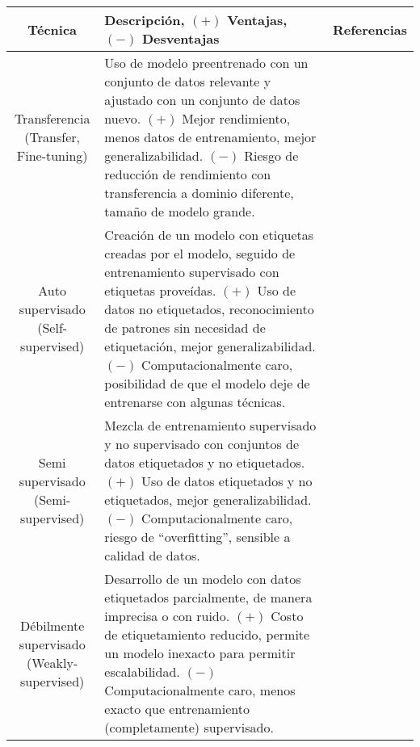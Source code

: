 \begin{center}
    \vspace{-\topsep}
    \begin{table}[h!]
        \footnotesize
        \begin{tabular}{ |c|m{9.5cm}|c| }
            \hline
            \bf Técnica & \bf Descripción, $(+)$ Ventajas, $(-)$ Desventajas & \bf Referencias \\
            \hline
            \makecell{Transferencia \\ (Transfer, Fine-tuning)} & Uso de modelo preentrenado con un conjunto de datos relevante y ajustado con un conjunto de datos nuevo. $(+)$ Mejor rendimiento, menos datos de entrenamiento, mejor generalizabilidad. $(-)$ Riesgo de reducción de rendimiento con transferencia a dominio diferente, tamaño de modelo grande. & \makecell{\autocite{safonova-2023,maggiori-2016-0,castelluccio-2015} \\ \autocite{nogueira-2017,zhong-2016,amato-2023}} \\
            \hline
            \makecell{Auto supervisado \\ (Self-supervised)} & Creación de un modelo con etiquetas creadas por el modelo, seguido de entrenamiento supervisado con etiquetas proveídas. $(+)$ Uso de datos no etiquetados, reconocimiento de patrones sin necesidad de etiquetación, mejor generalizabilidad. $(-)$ Computacionalmente caro, posibilidad de que el modelo deje de entrenarse con algunas técnicas. & \autocite{safonova-2023} \\
            \hline
            \makecell{Semi supervisado \\ (Semi-supervised)} & Mezcla de entrenamiento supervisado y no supervisado con conjuntos de datos etiquetados y no etiquetados. $(+)$ Uso de datos etiquetados y no etiquetados, mejor generalizabilidad. $(-)$ Computacionalmente caro, riesgo de \enquote{overfitting}, sensible a calidad de datos. & \autocite{safonova-2023} \\
            \hline
            \makecell{Débilmente supervisado \\ (Weakly-supervised)} & Desarrollo de un modelo con datos etiquetados parcialmente, de manera imprecisa o con ruido. $(+)$ Costo de etiquetamiento reducido, permite un modelo inexacto para permitir escalabilidad. $(-)$ Computacionalmente caro, menos exacto que entrenamiento (completamente) supervisado. & \autocite{safonova-2023} \\
            \hline

\end{tabular}
\end{table}
\end{center}
